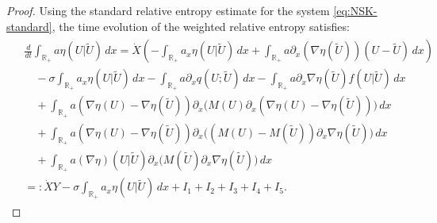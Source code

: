 \documentclass[11pt,reqno]{amsart}
\numberwithin{equation}{section} %
\begin{document}
\begin{proof}
    Using the standard relative entropy estimate \cite{D96,D79,KV21} for the system \eqref{eq:NSK-standard}, the time evolution of the weighted relative entropy satisfies:
    \begin{align}
    	\begin{aligned}\label{est:rel-ent}
        &\frac{d}{dt}\int_{\mathbb{R}_+}a\eta(U|\tilde{U})\,dx
        =\dot{X}\left(-\int_{\mathbb{R}_+}a_x\eta(U|\tilde{U})\,dx+\int_{\mathbb{R}_+}a\partial_x(\nabla\eta(\tilde{U}))(U-\tilde{U})\,dx\right)\\
        &\quad -\sigma\int_{\mathbb{R}_+}a_x\eta(U|\tilde{U})\,dx -\int_{\mathbb{R}_+}a\partial_xq(U;\tilde{U})\,dx-\int_{\mathbb{R}_+}a\partial_x\nabla\eta(\tilde{U})f(U|\tilde{U})\,dx\\
        &\quad + \int_{\mathbb{R}_+}a(\nabla\eta(U)-\nabla\eta(\tilde{U}))\partial_x\Big(M(U)\partial_x(\nabla\eta(U)-\nabla\eta(\tilde{U}))\Big)\,dx\\
        &\quad +\int_{\mathbb{R}_+}a(\nabla\eta(U)-\nabla\eta(\tilde{U}))\partial_x\Big((M(U)-M(\tilde{U}))\partial_x\nabla\eta(\tilde{U})\Big)\,dx\\
        &\quad + \int_{\mathbb{R}_+}a(\nabla\eta)(U|\tilde{U})\partial_x\Big(M(\tilde{U})\partial_x\nabla\eta(\tilde{U})\Big)\,dx \\
        &=: \dot{X}Y -\sigma\int_{\mathbb{R}_+}a_x\eta(U|\tilde{U})\,dx + I_1 + I_2 + I_3 + I_4 + I_5.
        \end{aligned}
    \end{align}	


\end{proof}
\end{document}
